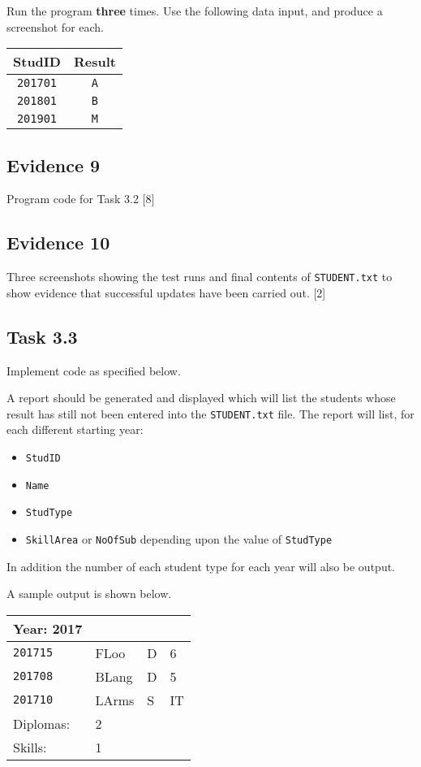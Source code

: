 Run the program \textbf{three} times. Use the following data input,
and produce a screenshot for each. 
\noindent \begin{center}
\begin{tabular}{cc}
StudID & Result\tabularnewline
\hline 
\texttt{201701} & \texttt{A}\tabularnewline
\texttt{201801} & \texttt{B}\tabularnewline
\texttt{201901} & \texttt{M}\tabularnewline
\end{tabular}
\par\end{center}

\subsection*{Evidence 9}

Program code for Task 3.2 \hfill{}{[}8{]}

\subsection*{Evidence 10 }

Three screenshots showing the test runs and final contents of \texttt{STUDENT.txt}
to show evidence that successful updates have been carried out. \hfill{}{[}2{]}

\subsection*{Task 3.3}

Implement code as specified below.

A report should be generated and displayed which will list the students
whose result has still not been entered into the \texttt{STUDENT.txt}
file. The report will list, for each different starting year: 
\begin{itemize}
\item \texttt{StudID} 
\item \texttt{Name} 
\item \texttt{StudType}
\item \texttt{SkillArea} or \texttt{NoOfSub} depending upon the value of
\texttt{StudType} 
\end{itemize}
In addition the number of each student type for each year will also
be output.

A sample output is shown below.
\noindent \begin{center}
\begin{tabular}{llll}
Year: 2017 &  &  & \tabularnewline
\hline 
\texttt{201715} & FLoo & D & 6\tabularnewline
\texttt{201708} & BLang & D & 5\tabularnewline
\texttt{201710} & LArms & S & IT\tabularnewline
Diplomas: & 2 &  & \tabularnewline
Skills: & 1 &  & \tabularnewline
\end{tabular}
\par\end{center}

